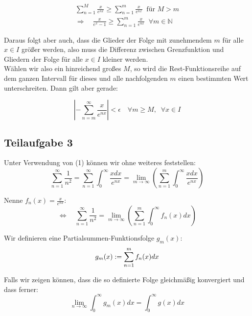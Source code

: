 \documentclass[a4paper,german,12pt,smallheadings]{scrartcl}
\begin{document}
\begin{align*}
\sum_{n=1}^{M}\frac{x}{e^{nx}} \ge \sum_{n=1}^{m}\frac{x}{e^{nx}} \;\; \text{für $M>m$}\\
\Rightarrow \quad \frac{x}{e^x-1} \ge \sum_{n=1}^{m}\frac{x}{e^{nx}} \;\; \forall m \in \mathbb{N}
\end{align*}

Daraus folgt aber auch, dass die Glieder der Folge mit zunehmendem $m$ für alle $x\in I$ größer werden, also muss die Differenz zwischen Grenzfunktion und Gliedern der Folge für alle $x \in I$ kleiner werden.\\
Wählen wir also ein hinreichend großes $M$, so wird die Rest-Funktionsreihe auf dem ganzen Intervall für dieses und alle nachfolgenden $m$ einen bestimmten Wert unterschreiten. Dann gilt aber gerade:

\begin{equation*}
\left|-\sum_{n=m}^{\infty}\frac{x}{e^{nx}}\right| < \epsilon \quad \forall m\geq M, \;\; \forall x \in I
\end{equation*}

\subsection*{Teilaufgabe 3}

Unter Verwendung von (1) können wir ohne weiteres feststellen:
\begin{equation*}
\sum_{n=1}^{\infty}\frac{1}{n^2}=\sum_{n=1}^{\infty}\int_{0}^{\infty}\frac{xdx}{e^{nx}}=\lim\limits_{m \to \infty}\left(\sum_{n=1}^{m}\int_{0}^{\infty}\frac{xdx}{e^{nx}}\right)
\end{equation*}

Nenne $f_n(x)=\frac{x}{e^{nx}}:$
\begin{equation*}
\Leftrightarrow \quad \sum_{n=1}^{\infty}\frac{1}{n^2}=\lim\limits_{m \to \infty}\left(\sum_{n=1}^{m}\int_{0}^{\infty}f_n(x)dx\right)
\end{equation*}

Wir definieren eine Partialsummen-Funktionsfolge $g_m(x)$:
\begin{equation*}
g_m(x):=\sum_{n=1}^{m}f_n(x)dx\\
\end{equation*}

Falls wir zeigen können, dass die so definierte Folge gleichmäßig konvergiert und dass ferner:
\begin{equation*}
\lim\limits_{n \to \infty}\int_{0}^{\infty}g_m(x)dx=\int_{0}^{\infty}g(x)dx
\end{equation*}
\end{document}
